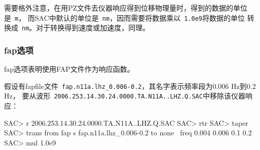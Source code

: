 需要格外注意，在用PZ文件去仪器响应得到位移物理量时，得到的数据的单位是~\verb+m+，
而SAC中默认的单位是~\verb+nm+，因而需要将数据乘以~\verb+1.0e9+将数据的单位
转换成~\verb+nm+。对于转换得到速度或加速度，同理。

\subsubsection{fap选项}
fap选项表明使用FAP文件作为响应函数。

假设有fapfile文件~\verb+fap.n11a.lhz_0.006-0.2+，其名字表示频率段为0.006 Hz到0.2 Hz，
要从波形~\verb+2006.253.14.30.24.0000.TA.N11A..LHZ.Q.SAC+中移除该仪器响应：
\begin{SACCode}
SAC> r 2006.253.14.30.24.0000.TA.N11A..LHZ.Q.SAC
SAC> rtr
SAC> taper
SAC> trans from fap s fap.n11a.lhz_0.006-0.2 to none \
                        freq 0.004 0.006 0.1 0.2
SAC> mul 1.0e9
\end{SACCode}
